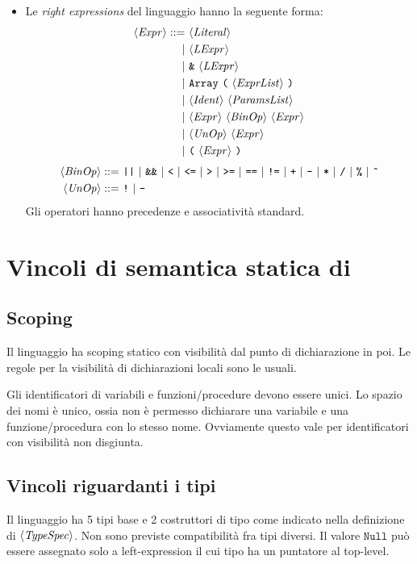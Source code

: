 \begin{itemize}
	\item Le \emph{right expressions} del linguaggio hanno la seguente forma:
	\begin{align*}
	\langle \mathit{Expr} \rangle ::=\ &\langle \mathit{Literal} \rangle\\
	|\ &\langle \mathit{LExpr} \rangle\\
	|\ &\texttt{\&}\ \langle \mathit{LExpr} \rangle\\
	|\ &\texttt{Array}\ \texttt{(}\ \langle \mathit{ExprList} \rangle\ \texttt{)}\\
	|\ &\langle \mathit{Ident} \rangle\ \langle \mathit{ParamsList} \rangle\\
	|\ &\langle \mathit{Expr} \rangle\ \langle \mathit{BinOp} \rangle\ \langle \mathit{Expr} \rangle\\
	|\ &\langle \mathit{UnOp} \rangle\ \langle \mathit{Expr} \rangle\\
	|\ &\texttt{(}\ \langle \mathit{Expr} \rangle\ \texttt{)}
	\end{align*}
	\begin{align*}
	\token{BinOp} ::=\ 
	&\texttt{||}\ |\ \texttt{\&\&}\ |\ \texttt{<}\ |\ \texttt{<=}\ |\ \texttt{>}\ |\ \texttt{>=}\ |\ \texttt{==}\ |\  \texttt{!=}\ 
	|\ \texttt{+}\ |\ \texttt{-}\ |\ \texttt{*}\ |\ \texttt{/}\ |\ \texttt{\%}\ |\ \texttt{\^{}} \\
	\token{UnOp} ::=\ &\texttt{!}\ |\ \texttt{-}
	\end{align*}
	Gli operatori hanno precedenze e associatività standard.
\end{itemize}

\section{Vincoli di semantica statica di \SBF}
\subsection*{Scoping}
Il linguaggio ha scoping statico con visibilità dal punto di dichiarazione in poi. Le regole per la visibilità di dichiarazioni locali sono le usuali.

Gli identificatori di variabili e funzioni/procedure devono essere unici. Lo spazio dei nomi è unico, ossia non è permesso dichiarare una variabile e una funzione/procedura con lo stesso nome. Ovviamente questo vale per identificatori con visibilità non disgiunta.

\subsection*{Vincoli riguardanti i tipi}
Il linguaggio ha 5 tipi base e 2 costruttori di tipo come indicato nella definizione di $\langle \mathit{TypeSpec} \rangle$. Non sono previste compatibilità fra tipi diversi. Il valore $\texttt{Null}$ può essere assegnato solo a left-expression il cui tipo ha un puntatore al top-level.

